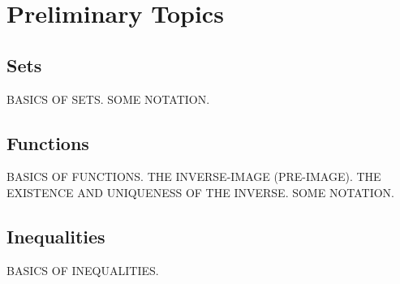 \section{Preliminary Topics}
\subsection{Sets}
BASICS OF SETS. SOME NOTATION.

\subsection{Functions}
BASICS OF FUNCTIONS. THE INVERSE-IMAGE (PRE-IMAGE). THE EXISTENCE AND UNIQUENESS OF THE INVERSE. SOME NOTATION.

\subsection{Inequalities}
BASICS OF INEQUALITIES.